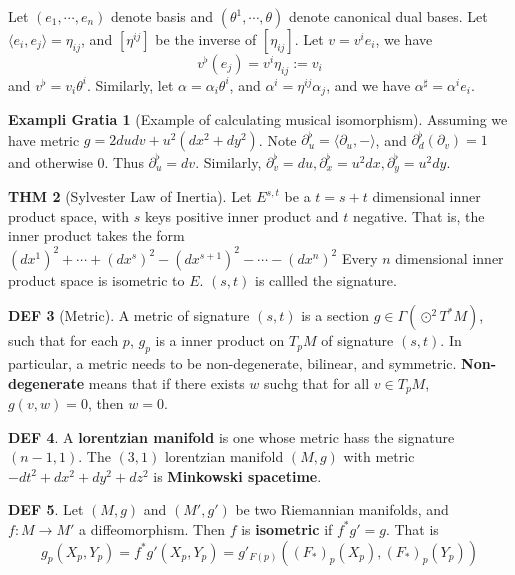 \documentclass[twocolumn]{article}
\renewcommand{\emph}[1]{{\color{blue!70!black}\sffamily\bfseries #1}}
\newcommand{\p}{\partial}
\newcommand{\G}{\Gamma}
\theoremstyle{definition}
\newtheorem{thm}{THM}
\newtheorem{example}[thm]{Exampli Gratia}
\newtheorem{defi}[thm]{DEF}
\begin{document}
\begin{eg}{}{}
	Let $(e_1, \cdots, e_n)$ denote basis and $(\theta^1, \cdots, \theta)$ denote canonical dual bases. 
	Let $\langle e_i, e_j\rangle = \eta_{ij}$, and $[\eta^{ij}]$ be the inverse of $[\eta_{ij}]$.
	Let $v = v^ie_i$, we have 
	$$
	v^{\flat}(e_j) = v^i \eta_{ij} := v_i
	$$
	and $v^{\flat}= v_i \theta^{i}$.
	Similarly, let $\alpha = \alpha_i \theta^i$, and $\alpha^i = \eta^{ij}\alpha_j$, and we have $\alpha^{\sharp} = \alpha^i e_i$.
\end{eg}

\begin{example}[Example of calculating musical isomorphism]
	Assuming we have metric $g = 2du dv + u^2(dx^2 + dy^2)$.
	Note $\p_u ^{\flat} = \langle \p_u, - \rangle$, and $\p_d^{\flat}(\p_v) = 1$ and otherwise $0$. Thus $\p_u^{\flat} = dv$.
	Similarly, $\p_v^{\flat} = du, \p_x^{\flat} = u^2 dx, \p_y^{\flat} = u^2 dy$.
\end{example}

\begin{thm}[Sylvester Law of Inertia]
	Let $E^{s,t}$ be a $t = s+t$ dimensional inner product space, with $s$ keys positive inner product and $t$ negative. That is, the inner product takes the form $(dx^1)^2 + \cdots + (dx^s)^2 - (dx^{s+1})^2 - \cdots - (dx^n)^2$
	Every $n$ dimensional inner product space is isometric to $E$.
	$(s, t)$ is callled the signature.
\end{thm}

\begin{defi}[Metric]
	A metric of signature $(s,t)$ is a section $g \in \G(\odot ^2 T^*M)$, such that for each $p$, $g_p$ is a inner product on $T_pM$ of signature $(s, t)$.
	In particular, a metric needs to be non-degenerate, bilinear, and symmetric.
	\emph{Non-degenerate} means that if there exists $w$ suchg that for all $v \in T_pM$, $g(v, w) = 0$, then $w = 0$.
\end{defi}

\begin{defi}
	A \emph{lorentzian manifold} is one whose metric hass the signature $(n-1,1)$.
	The $(3,1)$ lorentzian manifold $(M, g)$ with metric $-dt^2 + dx^2 + dy^2 + dz^2$ is \emph{Minkowski spacetime}.
\end{defi}

\begin{defi}
	Let $(M, g)$ and $(M', g')$ be two Riemannian manifolds, and $f: M \rightarrow M'$ a diffeomorphism. 
	Then $f$ is \emph{isometric} if $f^*g' = g$.
	That is 
	$$
	g_p(X_p, Y_p) = f^*g'(X_p, Y_p) = g'_{F(p)}((F_*)_p(X_p), (F_*)_p(Y_p))
	$$
\end{defi}
\end{document}
